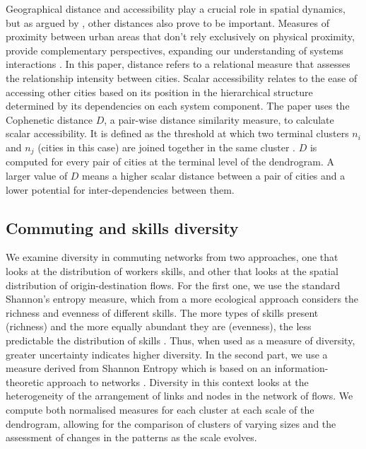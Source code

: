 \documentclass[11pt, a4paper]{article}
\begin{document}
Geographical distance and accessibility play a crucial role in spatial dynamics, but as argued by \citep{Rozenblat2013}, other distances also prove to be important. Measures of proximity between urban areas that don't rely exclusively on physical proximity, provide complementary perspectives, expanding our understanding of systems interactions \citep{Rozenblat2022}. In this paper, distance refers to a relational measure that assesses the relationship intensity between cities. Scalar accessibility relates to the ease of accessing other cities based on its position in the hierarchical structure determined by its dependencies on each system component. The paper uses the Cophenetic distance $D$, a pair-wise distance similarity measure, to calculate scalar accessibility. It is defined as the threshold at which two terminal clusters $n_i$ and $n_j$ (cities in this case) are joined together in the same cluster \citep{Sokal1962}. $D$ is computed for every pair of cities at the terminal level of the dendrogram. A larger value of $D$ means a higher scalar distance between a pair of cities and a lower potential for inter-dependencies between them.


\subsection{Commuting and skills diversity}

We examine diversity in commuting networks from two approaches, one that looks at the distribution of workers skills, and other that looks at the spatial distribution of origin-destination flows. For the first one, we use the standard Shannon's entropy measure, which from a more ecological approach considers the richness and evenness of different skills. The more types of skills present (richness) and the more equally abundant they are (evenness), the less predictable the distribution of skills \citep{Hamilton2005,heip1998indices}. Thus, when used as a measure of diversity, greater uncertainty indicates higher diversity. In the second part, we use a measure derived from Shannon Entropy which is based on an information-theoretic approach to networks \citep{Sole2004, Wilhelm2007, Marin2022}. Diversity in this context looks at the heterogeneity of the arrangement of links and nodes in the network of flows. We compute both normalised measures for each cluster at each scale of the dendrogram, allowing for the comparison of clusters of varying sizes and the assessment of changes in the patterns as the scale evolves.
\end{document}
